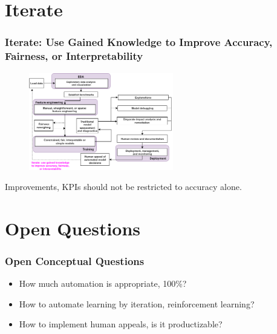 \documentclass[11pt,
               aspectratio=169,
               hyperref={colorlinks}
               ]{beamer}
\begin{document}
	\section{Iterate}

		\begin{frame}	

			\frametitle{Iterate: Use Gained Knowledge to Improve Accuracy, Fairness, or Interpretability}		
			
			\begin{figure}[htb]
				\begin{center}
					\includegraphics[height=120pt]{img/iter.png}
					\label{fig:blueprint}
				\end{center}
			\end{figure}	

			\centering
			
			Improvements, KPIs should not be restricted to accuracy alone.
		
		\end{frame}

	\section{Open Questions}

		\begin{frame}

			\frametitle{Open Conceptual Questions}		

			\begin{itemize}
				\item How much automation is appropriate, 100\%?
				\item How to automate learning by iteration, reinforcement learning?
				\item How to implement human appeals, is it productizable?
			\end{itemize}
			
		\end{frame}
\end{document}
